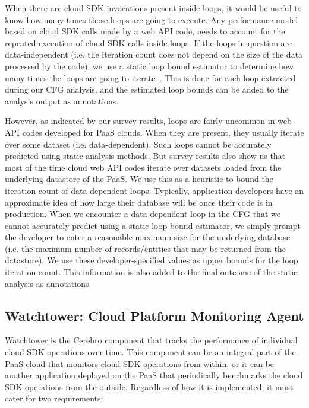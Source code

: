 When there are cloud SDK invocations present inside loops, it would be useful to know how many times those loops
are going to execute. Any performance model based on cloud SDK calls made by a web API code,
needs to account for the repeated execution of cloud SDK calls inside loops. If the 
loops in question are data-independent (i.e. the iteration count does not depend on the size of the data processed 
by the code), we use a static loop bound estimator to determine how many times the loops are going to iterate~\cite{bygde2010static,Gulwani:2009:CRP:1542476.1542518,Lokuciejewski:2009:FPS:1545006.1545064,Hunt:2006:PCL:1167999.1168026}.
This is done for each loop extracted during our CFG analysis, and the estimated loop bounds can be added to the
analysis output as annotations.

However, as indicated by our survey results, loops are fairly uncommon in web API codes developed for PaaS clouds. When
they are present, they usually iterate over some dataset (i.e. data-dependent). Such loops cannot
be accurately predicted using static analysis methods. But survey results also show us that
most of the time cloud web API codes iterate over datasets loaded from the underlying datastore of the PaaS.
We use this as a heuristic to bound the iteration count of data-dependent loops. Typically, application developers
have an approximate idea of how large their database will be once their code is in production. When we encounter a data-dependent
loop in the CFG that we cannot accurately predict using a static loop bound estimator, we simply
prompt the developer to enter a reasonable maximum size for the underlying database (i.e. the maximum number of
records/entities that may be returned from the datastore). We
use these developer-specified values as upper bounds for the loop iteration count. 
This information is also added to the final outcome of the static analysis as annotations.

\subsection{Watchtower: Cloud Platform Monitoring Agent}
Watchtower is the Cerebro component that tracks the performance of individual
cloud SDK operations over time. This component can be an integral part of the PaaS cloud that
monitors cloud SDK operations from within, or it can be another application deployed on the PaaS
that periodically benchmarks the cloud SDK operations from the outside. Regardless of how it is
implemented, it must cater for two requirements:

